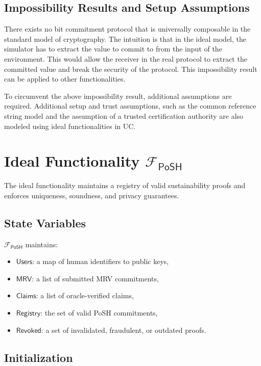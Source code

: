 \documentclass[11pt,a4paper]{report}
\theoremstyle{definition}
\theoremstyle{remark}
\begin{document}
\subsection{Impossibility Results and Setup Assumptions}

There exists no bit commitment protocol that is universally composable in the
standard model of cryptography. The intuition is that in the ideal model, the
simulator has to extract the value to commit to from the input of the
environment. This would allow the receiver in the real protocol to extract the
committed value and break the security of the protocol. This impossibility
result can be applied to other functionalities.

To circumvent the above impossibility result, additional assumptions are
required. Additional setup and trust assumptions, such as the common reference
string model and the assumption of a trusted certification authority are also
modeled using ideal functionalities in UC.

\section{Ideal Functionality \texorpdfstring{$\mathcal{F}_{\textsf{PoSH}}$}{F-PoSH}}

The ideal functionality maintains a registry of valid sustainability proofs and
enforces uniqueness, soundness, and privacy guarantees.

\subsection*{State Variables}

$\mathcal{F}_{\textsf{PoSH}}$ maintains:

\begin{itemize}[leftmargin=*]
  \item $\mathsf{Users}$: a map of human identifiers to public keys,
  \item $\mathsf{MRV}$: a list of submitted MRV commitments,
  \item $\mathsf{Claims}$: a list of oracle-verified claims,
  \item $\mathsf{Registry}$: the set of valid PoSH commitments,
  \item $\mathsf{Revoked}$: a set of invalidated, fraudulent, or outdated proofs.
\end{itemize}

\subsection*{Initialization}
\end{document}
